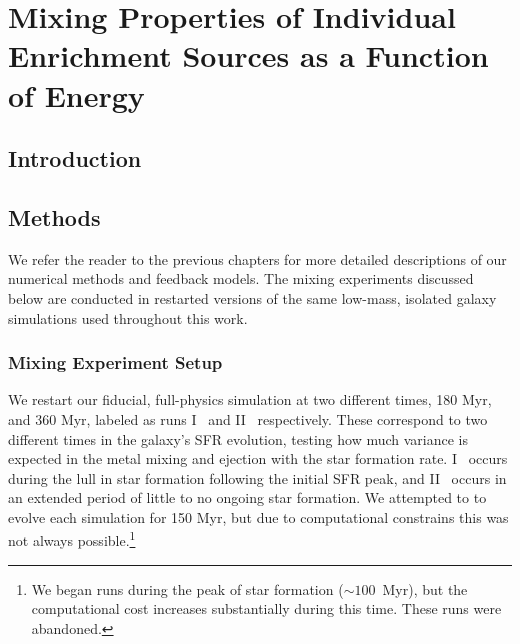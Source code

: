 \chapter[Mixing Properties of Individual Enrichment Sources as a Function of Energy]{Mixing Properties of Individual Enrichment Sources as a Function of Energy\label{ch:chapter4}}
\let\thefootnote\relax{}

%
%

\newcommand{\runone}{I\_}
\newcommand{\runonenu}{I}
\newcommand{\runtwo}{II\_}
\newcommand{\runtwonu}{II}

\section{Introduction}


\section{Methods}
\label{ch4:sec:methods}
We refer the reader to the previous chapters for more detailed descriptions of our numerical methods and feedback models. The mixing experiments discussed below are conducted in restarted versions of the same low-mass, isolated galaxy simulations used throughout this work.




\subsection{Mixing Experiment Setup}
\label{ch4:sec:experiment}
We restart our fiducial, full-physics simulation at two different times, 180 Myr, and 360 Myr, labeled as runs \runonenu~ and \runtwonu~ respectively. These correspond to two different times in the galaxy's SFR evolution, testing how much variance is expected in the metal mixing and ejection with the star formation rate. \runonenu~ occurs during the lull in star formation following the initial SFR peak, and \runtwonu~ occurs in an extended period of little to no ongoing star formation. We attempted to to evolve each simulation for 150 Myr, but due to computational constrains this was not always possible.\footnote{We began runs during the peak of star formation ($\sim 100$~Myr), but the computational cost increases substantially during this time. These runs were abandoned.}


